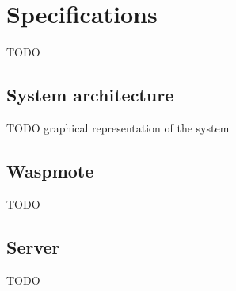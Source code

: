 \chapter{Specifications}
\label{chapter:specifications}
TODO

\section{System architecture}
TODO graphical representation of the system

\section{Waspmote}
TODO

\section{Server}
TODO






